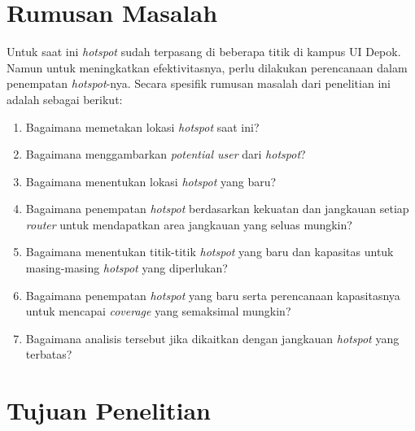\section{Rumusan Masalah}

Untuk saat ini \textit{hotspot} sudah terpasang di beberapa titik di kampus UI Depok. Namun untuk meningkatkan efektivitasnya, perlu dilakukan perencanaan dalam penempatan \textit{hotspot}-nya. Secara spesifik rumusan masalah dari penelitian ini adalah sebagai berikut:

\begin{enumerate}
	\item Bagaimana memetakan lokasi \textit{hotspot} saat ini?
	\item Bagaimana menggambarkan \textit{potential user} dari \textit{hotspot}?
	\item Bagaimana menentukan lokasi \textit{hotspot} yang baru?
	\item Bagaimana penempatan \textit{hotspot} berdasarkan kekuatan dan jangkauan setiap \textit{router} untuk mendapatkan area jangkauan yang seluas mungkin?
	\item Bagaimana menentukan titik-titik \textit{hotspot} yang baru dan kapasitas untuk masing-masing \textit{hotspot} yang diperlukan?
	\item Bagaimana penempatan \textit{hotspot} yang baru serta perencanaan kapasitasnya untuk mencapai \textit{coverage} yang semaksimal mungkin?
	\item Bagaimana analisis tersebut jika dikaitkan dengan jangkauan \textit{hotspot} yang terbatas?

\end{enumerate}

\section{Tujuan Penelitian}



 
